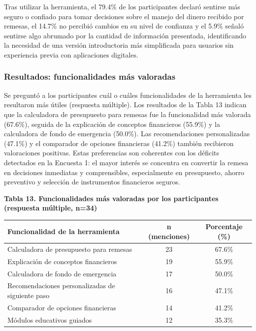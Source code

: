 \documentclass[12pt,letterpaper]{article}
\begin{document}
Tras utilizar la herramienta, el 79.4\% de los participantes declaró sentirse más seguro o confiado para tomar decisiones sobre el manejo del dinero recibido por remesas, el 14.7\% no percibió cambios en su nivel de confianza y el 5.9\% señaló sentirse algo abrumado por la cantidad de información presentada, identificando la necesidad de una versión introductoria más simplificada para usuarios sin experiencia previa con aplicaciones digitales.

\subsubsection{\texorpdfstring{\textbf{Resultados: funcionalidades más valoradas}}{Resultados: funcionalidades más valoradas}}\label{resultados-funcionalidades-muxe1s-valoradas}

Se preguntó a los participantes cuál o cuáles funcionalidades de la herramienta les resultaron más útiles (respuesta múltiple). Los resultados de la Tabla 13 indican que la calculadora de presupuesto para remesas fue la funcionalidad más valorada (67.6\%), seguida de la explicación de conceptos financieros (55.9\%) y la calculadora de fondo de emergencia (50.0\%). Las recomendaciones personalizadas (47.1\%) y el comparador de opciones financieras (41.2\%) también recibieron valoraciones positivas. Estas preferencias son coherentes con los déficits detectados en la Encuesta 1: el mayor interés se concentra en convertir la remesa en decisiones inmediatas y comprensibles, especialmente en presupuesto, ahorro preventivo y selección de instrumentos financieros seguros.

\textbf{Tabla 13. Funcionalidades más valoradas por los participantes (respuesta múltiple, n=34)}

\begin{longtable}[]{@{}lcc@{}}
\toprule\noalign{}
Funcionalidad de la herramienta & n (menciones) & Porcentaje (\%) \\
\midrule\noalign{}
\endhead
\bottomrule\noalign{}
\endlastfoot
Calculadora de presupuesto para remesas & 23 & 67.6\% \\
Explicación de conceptos financieros & 19 & 55.9\% \\
Calculadora de fondo de emergencia & 17 & 50.0\% \\
Recomendaciones personalizadas de siguiente paso & 16 & 47.1\% \\
Comparador de opciones financieras & 14 & 41.2\% \\
Módulos educativos guiados & 12 & 35.3\% \\
\end{longtable}
\end{document}
